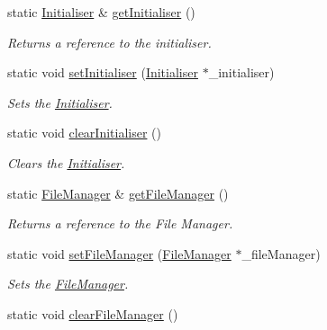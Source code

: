 \begin{DoxyCompactItemize}
\item 
static \hyperlink{class_cookie_eng_1_1_services_1_1_initialiser}{Initialiser} \& \hyperlink{class_cookie_eng_1_1_services_1_1_service_locator_af235353d13e544fe474d6908ef4f96fb}{get\+Initialiser} ()
\begin{DoxyCompactList}\small\item\em Returns a reference to the initialiser. \end{DoxyCompactList}\item 
static void \hyperlink{class_cookie_eng_1_1_services_1_1_service_locator_a49766d5e7cdca3f2384feb4258c9a155}{set\+Initialiser} (\hyperlink{class_cookie_eng_1_1_services_1_1_initialiser}{Initialiser} $\ast$\+\_\+initialiser)
\begin{DoxyCompactList}\small\item\em Sets the \hyperlink{class_cookie_eng_1_1_services_1_1_initialiser}{Initialiser}. \end{DoxyCompactList}\item 
static void \hyperlink{class_cookie_eng_1_1_services_1_1_service_locator_a1603a231c16663c30ed40afd49dffb72}{clear\+Initialiser} ()
\begin{DoxyCompactList}\small\item\em Clears the \hyperlink{class_cookie_eng_1_1_services_1_1_initialiser}{Initialiser}. \end{DoxyCompactList}\item 
static \hyperlink{class_cookie_eng_1_1_services_1_1_file_manager}{File\+Manager} \& \hyperlink{class_cookie_eng_1_1_services_1_1_service_locator_a964340ed78281fdd04f499c80f7ce01d}{get\+File\+Manager} ()
\begin{DoxyCompactList}\small\item\em Returns a reference to the File Manager. \end{DoxyCompactList}\item 
static void \hyperlink{class_cookie_eng_1_1_services_1_1_service_locator_a8a58e7b22845b4bf688cd98d2d78a72d}{set\+File\+Manager} (\hyperlink{class_cookie_eng_1_1_services_1_1_file_manager}{File\+Manager} $\ast$\+\_\+file\+Manager)
\begin{DoxyCompactList}\small\item\em Sets the \hyperlink{class_cookie_eng_1_1_services_1_1_file_manager}{File\+Manager}. \end{DoxyCompactList}\item 
static void \hyperlink{class_cookie_eng_1_1_services_1_1_service_locator_a648c75987f9d4380475b3c2056f6d963}{clear\+File\+Manager} ()

\end{DoxyCompactItemize}
